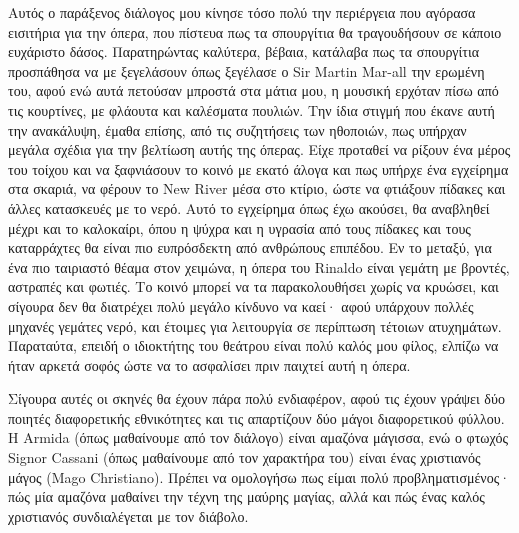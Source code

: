 Αυτός ο παράξενος διάλογος μου κίνησε τόσο πολύ την περιέργεια που αγόρασα εισιτήρια για την όπερα, που πίστευα πως τα σπουργίτια θα τραγουδήσουν σε κάποιο ευχάριστο δάσος. Παρατηρώντας καλύτερα, βέβαια, κατάλαβα πως τα σπουργίτια προσπάθησα να με ξεγελάσουν όπως ξεγέλασε ο Sir Martin Mar-all την ερωμένη του, αφού ενώ αυτά πετούσαν μπροστά στα μάτια μου, η μουσική ερχόταν πίσω από τις κουρτίνες, με φλάουτα και καλέσματα πουλιών. Την ίδια στιγμή που έκανε αυτή την ανακάλυψη, έμαθα επίσης, από τις συζητήσεις των ηθοποιών, πως υπήρχαν μεγάλα σχέδια για την βελτίωση αυτής της όπερας. Είχε προταθεί να ρίξουν ένα μέρος του τοίχου και να ξαφνιάσουν το κοινό με εκατό άλογα και πως υπήρχε ένα εγχείρημα στα σκαριά, να φέρουν το New River μέσα στο κτίριο, ώστε να φτιάξουν πίδακες και άλλες κατασκευές με το νερό. Αυτό το εγχείρημα όπως έχω ακούσει, θα αναβληθεί μέχρι και το καλοκαίρι, όπου η ψύχρα και η υγρασία από τους πίδακες και τους καταρράχτες θα είναι πιο ευπρόσδεκτη από ανθρώπους επιπέδου. Εν το μεταξύ, για ένα πιο ταιριαστό θέαμα στον χειμώνα, η όπερα του Rinaldo είναι γεμάτη με βροντές, αστραπές και φωτιές. Το κοινό μπορεί να τα παρακολουθήσει χωρίς να κρυώσει, και σίγουρα δεν θα διατρέχει πολύ μεγάλο κίνδυνο να καεί· αφού υπάρχουν πολλές μηχανές γεμάτες νερό, και έτοιμες για λειτουργία σε περίπτωση τέτοιων ατυχημάτων. Παραταύτα, επειδή ο ιδιοκτήτης του θεάτρου είναι πολύ καλός μου φίλος, ελπίζω να ήταν αρκετά σοφός ώστε να το ασφαλίσει πριν παιχτεί αυτή η όπερα.

Σίγουρα αυτές οι σκηνές θα έχουν πάρα πολύ ενδιαφέρον, αφού τις έχουν γράψει δύο ποιητές διαφορετικής εθνικότητες και τις απαρτίζουν δύο μάγοι διαφορετικού φύλλου. Η Armida (όπως μαθαίνουμε από τον διάλογο) είναι αμαζόνα μάγισσα, ενώ ο φτωχός Signor Cassani (όπως μαθαίνουμε από τον χαρακτήρα του) είναι ένας χριστιανός μάγος (Mago Christiano). Πρέπει να ομολογήσω πως είμαι πολύ προβληματισμένος· πώς μία αμαζόνα μαθαίνει την τέχνη της μαύρης μαγίας, αλλά και πώς ένας καλός χριστιανός συνδιαλέγεται με τον διάβολο.

